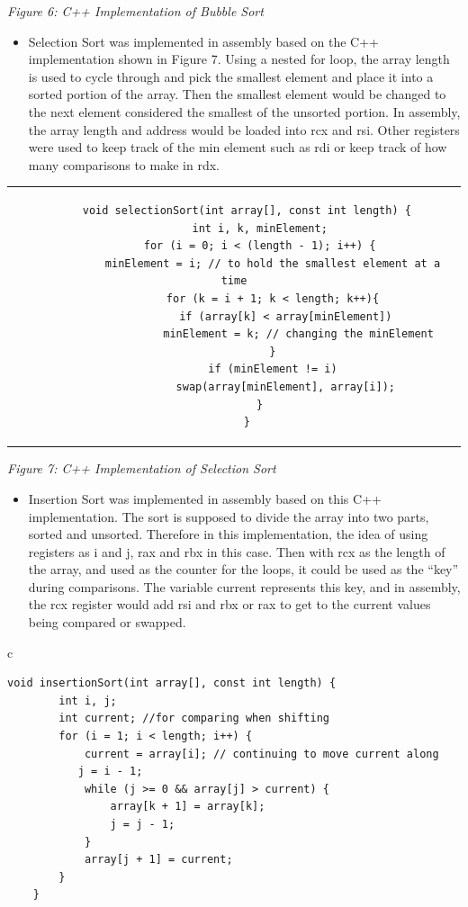 \documentclass[twoside]{article}
\begin{document}
\begin{center}\textit{Figure 6: C++ Implementation of Bubble Sort}\end{center}
\begin{itemize}
\item Selection Sort was implemented in assembly based on the C++ implementation shown in Figure 7. Using a nested for loop, the array length is used to cycle through and pick the smallest element and place it into a sorted portion of the array. Then the smallest element would be changed to the next element considered the smallest of the unsorted portion. In assembly, the array length and address would be loaded into rcx and rsi.  Other registers were used to keep track of the min element such as rdi or keep track of how many comparisons to make in rdx. 
\end{itemize}
\begin{center} \begin{tabular}{c} \begin{lstlisting}
    void selectionSort(int array[], const int length) {
        int i, k, minElement;
        for (i = 0; i < (length - 1); i++) {
            minElement = i; // to hold the smallest element at a time
            for (k = i + 1; k < length; k++){
                if (array[k] < array[minElement])
                    minElement = k; // changing the minElement
            }
            if (minElement != i)
                swap(array[minElement], array[i]);
        }
    }
\end{lstlisting} \end{tabular} \end{center}
\begin{center}\textit{Figure 7: C++ Implementation of Selection Sort}\end{center}
\begin{itemize}
\item Insertion Sort was implemented in assembly based on this C++ implementation. The sort is supposed to divide the array into two parts, sorted and unsorted. Therefore in this implementation, the idea of using registers as i and j, rax and rbx in this case. Then with rcx as the length of the array, and used as the counter for the loops, it could be used as the “key” during comparisons. The variable current represents this key, and in assembly, the rcx register would add rsi and rbx or rax to get to the current values being compared or swapped. 
\end{itemize}
\begin{center} \begin{tabular}{c} \begin{lstlisting}
void insertionSort(int array[], const int length) {
        int i, j;
        int current; //for comparing when shifting
        for (i = 1; i < length; i++) {
            current = array[i]; // continuing to move current along
           j = i - 1;
            while (j >= 0 && array[j] > current) { 
                array[k + 1] = array[k];
                j = j - 1;
            }
            array[j + 1] = current;
        }
    }
\end{lstlisting} \end{tabular} \end{center}
\end{document}
